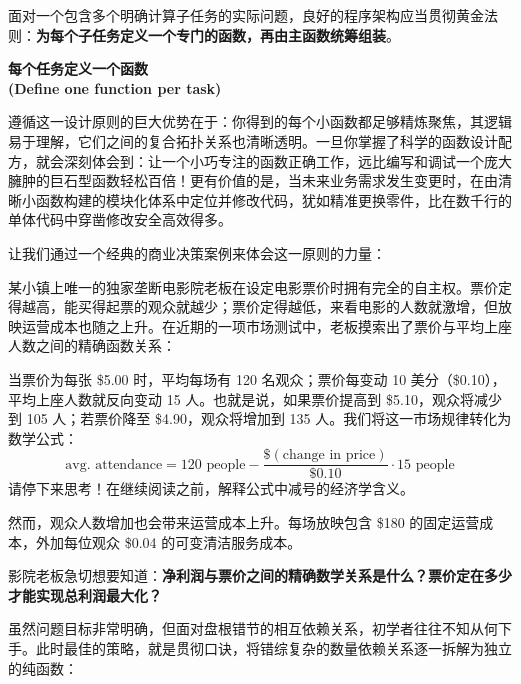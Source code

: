 面对一个包含多个明确计算子任务的实际问题，良好的程序架构应当贯彻黄金法则：\textbf{为每个子任务定义一个专门的函数，再由主函数统筹组装}。

\begin{notebox}[核心设计口诀]
\centering\Large\bfseries
每个任务定义一个函数\\
(Define one function per task)
\end{notebox}

遵循这一设计原则的巨大优势在于：你得到的每个小函数都足够精炼聚焦，其逻辑易于理解，它们之间的复合拓扑关系也清晰透明。一旦你掌握了科学的函数设计配方，就会深刻体会到：让一个小巧专注的函数正确工作，远比编写和调试一个庞大臃肿的巨石型函数轻松百倍！更有价值的是，当未来业务需求发生变更时，在由清晰小函数构建的模块化体系中定位并修改代码，犹如精准更换零件，比在数千行的单体代码中穿凿修改安全高效得多。

让我们通过一个经典的商业决策案例来体会这一原则的力量：

\begin{notebox}
某小镇上唯一的独家垄断电影院老板在设定电影票价时拥有完全的自主权。票价定得越高，能买得起票的观众就越少；票价定得越低，来看电影的人数就激增，但放映运营成本也随之上升。在近期的一项市场测试中，老板摸索出了票价与平均上座人数之间的精确函数关系：

当票价为每张 \$5.00 时，平均每场有 120 名观众；票价每变动 10 美分（\$0.10），平均上座人数就反向变动 15 人。也就是说，如果票价提高到 \$5.10，观众将减少到 105 人；若票价降至 \$4.90，观众将增加到 135 人。我们将这一市场规律转化为数学公式：
\[
  \text{avg.\ attendance} = 120\text{ people} - \frac{\$(\text{change in price})}{\$0.10} \cdot 15\text{ people}
\]
请停下来思考！在继续阅读之前，解释公式中减号的经济学含义。

然而，观众人数增加也会带来运营成本上升。每场放映包含 \$180 的固定运营成本，外加每位观众 \$0.04 的可变清洁服务成本。

影院老板急切想要知道：\textbf{净利润与票价之间的精确数学关系是什么？票价定在多少才能实现总利润最大化？}
\end{notebox}

虽然问题目标非常明确，但面对盘根错节的相互依赖关系，初学者往往不知从何下手。此时最佳的策略，就是贯彻口诀，将错综复杂的数量依赖关系逐一拆解为独立的纯函数：

